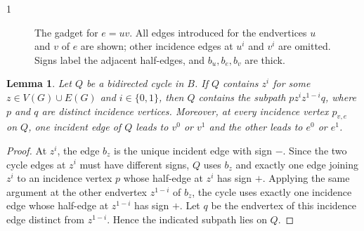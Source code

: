 \documentclass[a4paper,11pt]{article}
\theoremstyle{plain}
\newtheorem{lemma}[theorem]{Lemma}
\theoremstyle{definition}
\theoremstyle{remark}
\begin{document}
\begin{spacing}{1}
\begin{figure}[H]
\caption{The gadget for $e=uv$.  All edges introduced for the endvertices
$u$ and $v$ of $e$ are shown; other incidence edges at $u^i$ and $v^i$ are
omitted.  Signs label the
adjacent half-edges, and $b_u,b_e,b_v$ are thick.}
\label{fig:edge-gadget}
\end{figure}

\begin{lemma}\label{lem:block-traversal}
Let $Q$ be a bidirected cycle in $B$.  If $Q$ contains $z^i$ for some
$z\in V(G)\cup E(G)$ and $i\in\{0,1\}$, then $Q$ contains the subpath
$pz^iz^{1-i}q$, where $p$ and $q$ are distinct incidence vertices.  Moreover,
at every
incidence vertex $p_{v,e}$ on $Q$, one incident edge of $Q$ leads to
$v^0$ or $v^1$ and the other leads to $e^0$ or $e^1$.
\end{lemma}

\begin{proof}
At $z^i$, the edge $b_z$ is the unique incident edge with sign $-$.  Since the
two cycle edges at $z^i$ must have different signs, $Q$ uses $b_z$ and exactly
one edge joining $z^i$ to an incidence vertex $p$ whose half-edge at
$z^i$ has sign $+$.  Applying the same argument at the other endvertex
$z^{1-i}$ of $b_z$, the cycle uses exactly one incidence edge whose half-edge
at $z^{1-i}$ has sign $+$.  Let $q$ be the endvertex of this incidence edge
distinct from $z^{1-i}$.  Hence the indicated subpath lies on $Q$.


\end{proof}
\end{spacing}
\end{document}
